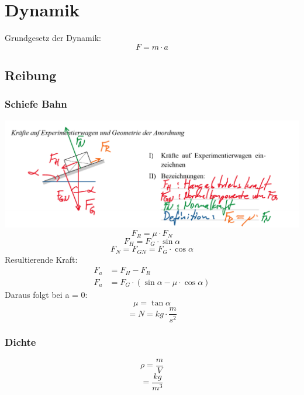 \documentclass[a4paper]{article}
\begin{document}
  \section{Dynamik}
  Grundgesetz der Dynamik:
  \begin{equation}
    F = m \cdot a
  \end{equation}

  \subsection{Reibung}

  \subsubsection{Schiefe Bahn}

  \includegraphics[width=\textwidth]{images/dynamik_schiefe_bahn.png}
  \begin{equation}
    F_R = \mu \cdot F_N
  \end{equation}
  \begin{equation}
    F_H = F_G \cdot \sin{\alpha}
  \end{equation}
  \begin{equation}
    F_N = F_{GN} = F_{G} \cdot \cos{\alpha}
  \end{equation}
  Resultierende Kraft:
  \begin{align}
    F_a &= F_H - F_R \\
    F_a &= F_G \cdot (\sin{\alpha} - \mu \cdot \cos{\alpha})
  \end{align}
  Daraus folgt bei a = 0:
  \begin{equation}
    \mu = \tan{\alpha}
  \end{equation}
  \begin{equation}
    [F] = N = kg \cdot \frac{m}{s^2}
  \end{equation}

  \subsubsection{Dichte}
  \begin{equation}
    \rho = \frac{m}{V}
  \end{equation}
  \begin{equation}
    [\rho] = \frac{kg}{m^3}
  \end{equation}
\end{document}
